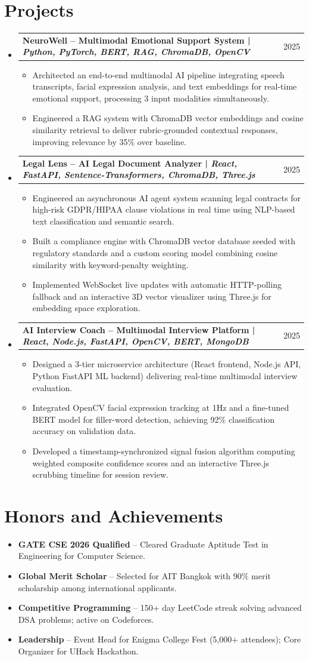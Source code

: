 \documentclass[letterpaper,10pt]{article}
\makeatletter
\newcommand{\resumeItem}[1]{\item\small{#1 \vspace{-2pt}}}
\newcommand{\resumeProjectHeading}[2]{
    \item
    \begin{tabular*}{\linewidth}{l@{\extracolsep{\fill}}r}
      \small\textbf{#1} & #2 \\
    \end{tabular*}\vspace{-7pt}
}
\newcommand{\resumeSubHeadingListStart}{\begin{itemize}[leftmargin=0.15in, label={}]}
\newcommand{\resumeSubHeadingListEnd}{\end{itemize}\vspace{-5pt}}
\newcommand{\resumeItemListStart}{\begin{itemize}[leftmargin=0.2in, label={$\bullet$}]}
\newcommand{\resumeItemListEnd}{\end{itemize}\vspace{-4pt}}
\makeatother
\begin{document}
\section{Projects}
  \resumeSubHeadingListStart
    \resumeProjectHeading
      {\textbf{NeuroWell -- Multimodal Emotional Support System} | \emph{Python, PyTorch, BERT, RAG, ChromaDB, OpenCV}}{2025}
      \resumeItemListStart
        \resumeItem{Architected an end-to-end multimodal AI pipeline integrating speech transcripts, facial expression analysis, and text embeddings for real-time emotional support, processing 3 input modalities simultaneously.}
        \resumeItem{Engineered a RAG system with ChromaDB vector embeddings and cosine similarity retrieval to deliver rubric-grounded contextual responses, improving relevance by 35\% over baseline.}
      \resumeItemListEnd

    \resumeProjectHeading
      {\textbf{Legal Lens -- AI Legal Document Analyzer} | \emph{React, FastAPI, Sentence-Transformers, ChromaDB, Three.js}}{2025}
      \resumeItemListStart
        \resumeItem{Engineered an asynchronous AI agent system scanning legal contracts for high-risk GDPR/HIPAA clause violations in real time using NLP-based text classification and semantic search.}
        \resumeItem{Built a compliance engine with ChromaDB vector database seeded with regulatory standards and a custom scoring model combining cosine similarity with keyword-penalty weighting.}
        \resumeItem{Implemented WebSocket live updates with automatic HTTP-polling fallback and an interactive 3D vector visualizer using Three.js for embedding space exploration.}
      \resumeItemListEnd

    \resumeProjectHeading
      {\textbf{AI Interview Coach -- Multimodal Interview Platform} | \emph{React, Node.js, FastAPI, OpenCV, BERT, MongoDB}}{2025}
      \resumeItemListStart
        \resumeItem{Designed a 3-tier microservice architecture (React frontend, Node.js API, Python FastAPI ML backend) delivering real-time multimodal interview evaluation.}
        \resumeItem{Integrated OpenCV facial expression tracking at 1Hz and a fine-tuned BERT model for filler-word detection, achieving 92\% classification accuracy on validation data.}
        \resumeItem{Developed a timestamp-synchronized signal fusion algorithm computing weighted composite confidence scores and an interactive Three.js scrubbing timeline for session review.}
      \resumeItemListEnd
  \resumeSubHeadingListEnd

\section{Honors and Achievements}
 \resumeItemListStart
    \resumeItem{\textbf{GATE CSE 2026 Qualified} -- Cleared Graduate Aptitude Test in Engineering for Computer Science.}
    \resumeItem{\textbf{Global Merit Scholar} -- Selected for AIT Bangkok with 90\% merit scholarship among international applicants.}
    \resumeItem{\textbf{Competitive Programming} -- 150+ day LeetCode streak solving advanced DSA problems; active on Codeforces.}
    \resumeItem{\textbf{Leadership} -- Event Head for Enigma College Fest (5,000+ attendees); Core Organizer for UHack Hackathon.}
 \resumeItemListEnd
\end{document}
